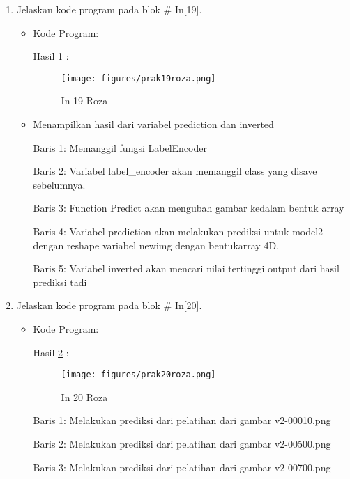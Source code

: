 \begin{enumerate}
\item Jelaskan kode program pada blok \# In[19].
\begin{itemize}
\item Kode Program:

\par Hasil \ref{in19roza} :
\begin{figure}[!hbtp]
\centering
\texttt{[image: figures/prak19roza.png]}
\caption{In 19 Roza}
\label{in19roza}
\end{figure}
\item Menampilkan hasil dari variabel prediction dan inverted
\par Baris 1: Memanggil fungsi LabelEncoder
\par Baris 2: Variabel label\_encoder akan memanggil class yang disave sebelumnya.
\par Baris 3: Function Predict akan mengubah gambar kedalam bentuk array
\par Baris 4: Variabel prediction akan melakukan prediksi untuk model2 dengan reshape variabel newimg dengan bentukarray 4D.
\par Baris 5: Variabel inverted akan mencari nilai tertinggi output dari hasil prediksi tadi
\end{itemize}
\par

\item Jelaskan kode program pada blok \# In[20].
\begin{itemize}
\item Kode Program:

\par Hasil \ref{in20roza} :
\begin{figure}[!hbtp]
\centering
\texttt{[image: figures/prak20roza.png]}
\caption{In 20 Roza}
\label{in20roza}
\end{figure}
\par Baris 1: Melakukan prediksi dari pelatihan dari gambar v2-00010.png
\par Baris 2: Melakukan prediksi dari pelatihan dari gambar v2-00500.png
\par Baris 3: Melakukan prediksi dari pelatihan dari gambar v2-00700.png 
\end{itemize}
\par


\end{enumerate}
